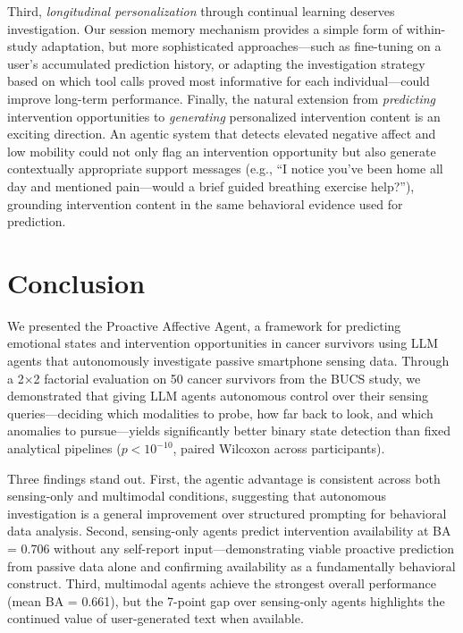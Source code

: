 \documentclass[screen,review,anonymous]{acmart}
\newcommand{\sys}{Proactive Affective Agent}
\begin{document}
Third, \emph{longitudinal personalization} through continual learning deserves investigation. Our session memory mechanism provides a simple form of within-study adaptation, but more sophisticated approaches---such as fine-tuning on a user's accumulated prediction history, or adapting the investigation strategy based on which tool calls proved most informative for each individual---could improve long-term performance. Finally, the natural extension from \emph{predicting} intervention opportunities to \emph{generating} personalized intervention content is an exciting direction. An agentic system that detects elevated negative affect and low mobility could not only flag an intervention opportunity but also generate contextually appropriate support messages (e.g., ``I notice you've been home all day and mentioned pain---would a brief guided breathing exercise help?''), grounding intervention content in the same behavioral evidence used for prediction.


\section{Conclusion}

We presented the \sys{}, a framework for predicting emotional states and intervention opportunities in cancer survivors using LLM agents that autonomously investigate passive smartphone sensing data. Through a 2$\times$2 factorial evaluation on 50 cancer survivors from the BUCS study, we demonstrated that giving LLM agents autonomous control over their sensing queries---deciding which modalities to probe, how far back to look, and which anomalies to pursue---yields significantly better binary state detection than fixed analytical pipelines ($p < 10^{-10}$, paired Wilcoxon across participants).

Three findings stand out. First, the agentic advantage is consistent across both sensing-only and multimodal conditions, suggesting that autonomous investigation is a general improvement over structured prompting for behavioral data analysis. Second, sensing-only agents predict intervention availability at BA = 0.706 without any self-report input---demonstrating viable proactive prediction from passive data alone and confirming availability as a fundamentally behavioral construct. Third, multimodal agents achieve the strongest overall performance (mean BA = 0.661), but the 7-point gap over sensing-only agents highlights the continued value of user-generated text when available.
\end{document}
